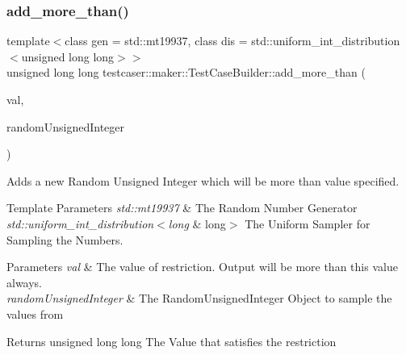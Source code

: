 \subsubsection{\texorpdfstring{add\+\_\+more\+\_\+than()}{add\_more\_than()}\hspace{0.1cm}{\footnotesize\ttfamily [2/2]}}
{\footnotesize\ttfamily template$<$class gen  = std\+::mt19937, class dis  = std\+::uniform\+\_\+int\+\_\+distribution$<$unsigned long long$>$$>$ \\
unsigned long long testcaser\+::maker\+::\+Test\+Case\+Builder\+::add\+\_\+more\+\_\+than (\begin{DoxyParamCaption}\item[{unsigned long long}]{val,  }\item[{\hyperlink{classtestcaser_1_1maker_1_1types_1_1RandomUnsignedInteger}{types\+::\+Random\+Unsigned\+Integer}$<$ gen, dis $>$ \&}]{random\+Unsigned\+Integer }\end{DoxyParamCaption})\hspace{0.3cm}{\ttfamily [inline]}}



Adds a new Random Unsigned Integer which will be more than value specified. 


\begin{DoxyTemplParams}{Template Parameters}
{\em std\+::mt19937} & The Random Number Generator \\
\hline
{\em std\+::uniform\+\_\+int\+\_\+distribution$<$long} & long$>$ The Uniform Sampler for Sampling the Numbers. \\
\hline
\end{DoxyTemplParams}

\begin{DoxyParams}{Parameters}
{\em val} & The value of restriction. Output will be more than this value always. \\
\hline
{\em random\+Unsigned\+Integer} & The Random\+Unsigned\+Integer Object to sample the values from \\
\hline
\end{DoxyParams}
\begin{DoxyReturn}{Returns}
unsigned long long The Value that satisfies the restriction 
\end{DoxyReturn}
\mbox{\label{classtestcaser_1_1maker_1_1TestCaseBuilder_a5c23f3b3d3533c48477741da8337af98}} 
